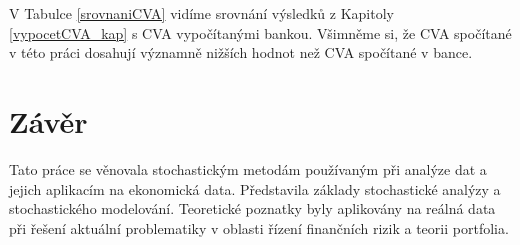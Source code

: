 \documentclass[a4paper,12pt]{report}
\theoremstyle{definition} \newtheorem{definice}[veta]{Definice}
\theoremstyle{remark}
\begin{document}
V Tabulce \ref{srovnaniCVA} vidíme srovnání výsledků z Kapitoly \ref{vypocetCVA_kap} s CVA vypočítanými bankou. 
Všimněme si, že CVA spočítané v této práci dosahují významně nižších hodnot než CVA spočítané v bance.
\begin{table}%
  \centering 
\caption{Srovnání výsledků výpočtů CVA dle metody popsané v této práci a dle metody používané v bance}
\label{srovnaniCVA}
\vspace{5mm}
\end{table}

\chapter*{Závěr} 


%

Tato práce se věnovala stochastickým metodám používaným při analýze dat a  jejich aplikacím na ekonomická data.
Představila základy stochastické analýzy a stochastického modelování.
Teoretické poznatky byly aplikovány na reálná data při řešení aktuální problematiky v oblasti řízení finančních rizik a teorii portfolia.
\end{document}

